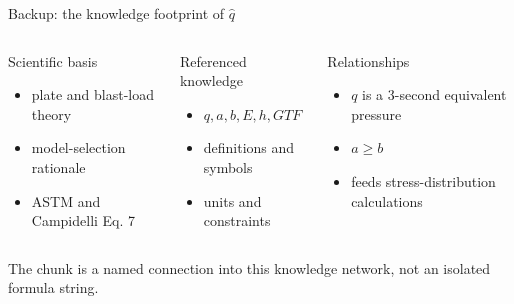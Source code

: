 \documentclass[aspectratio=169,10pt]{beamer}
\newcommand{\qhat}{\ensuremath{\hat{q}}}
\newcommand{\claim}[1]{%
  \begin{center}
    \setlength{\fboxsep}{7pt}%
    \colorbox{drasilblue!9}{\parbox{0.88\linewidth}{\centering #1}}%
  \end{center}
}
\begin{document}
\begin{frame}{Backup: the knowledge footprint of \qhat{}}
\begin{center}
\Large
\color{drasilblue}{$\displaystyle\boxed{\qhat=\frac{q(ab)^2}{E h^4\,\mathit{GTF}}}$}
\end{center}
\vspace{0.25em}
\small
\begin{columns}[T,onlytextwidth]
\begin{block}{Scientific basis}
\begin{itemize}
  \item plate and blast-load theory
  \item model-selection rationale
  \item ASTM and Campidelli Eq. 7
\end{itemize}
\end{block}
\begin{block}{Referenced knowledge}
\begin{itemize}
  \item $q,a,b,E,h,\mathit{GTF}$
  \item definitions and symbols
  \item units and constraints
\end{itemize}
\end{block}
\begin{block}{Relationships}
\begin{itemize}
  \item $q$ is a 3-second equivalent pressure
  \item $a\geq b$
  \item feeds stress-distribution calculations
\end{itemize}
\end{block}
\end{columns}
\vspace{0.4em}
\claim{The chunk is a named connection into this knowledge network, not an isolated formula string.}
\end{frame}
\end{document}
